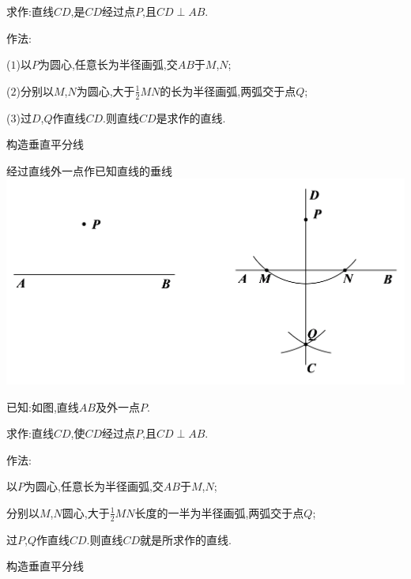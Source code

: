 \documentclass[cn,blue,12pt]{elegantbook}
\begin{document}
\begin{zsyd}
\begin{zsyd}
\begin{zsyd}
        \item 求作:直线\(CD\),是\(CD\)经过点\(P\),且\(CD \perp AB.\)
        \item 作法:
            \begin{zsyd}
            \item (\(1\))以\(P\)为圆心,任意长为半径画弧,交\(AB\)于\(M\),\(N\);
            \item (\(2\))分别以\(M\),\(N\)为圆心,大于\(\frac{1}{2}MN\)的长为半径画弧,两弧交于点\(Q\);
            \item (\(3\))过\(D\),\(Q\)作直线\(CD.\)则直线\(CD\)是求作的直线.
            \end{zsyd}
        \end{zsyd}
\begin{note}
            构造垂直平分线
\end{note}
    \item 经过直线外一点作已知直线的垂线\\
        \includegraphics[width=0.8\linewidth]{pic/20200515009.png}\\
        \begin{zsyd}
        \item 已知:如图,直线\(AB\)及外一点\(P.\)
        \item 求作:直线\(CD\),使\(CD\)经过点\(P\),且\(CD \perp AB.\)
        \item 作法:
            \begin{zsyd}
            \item 以\(P\)为圆心,任意长为半径画弧,交\(AB\)于\(M\),\(N\);
            \item 分别以\(M\),\(N\)圆心,大于\(\frac{1}{2}MN\)长度的一半为半径画弧,两弧交于点\(Q\);
            \item 过\(P\),\(Q\)作直线\(CD.\)则直线\(CD\)就是所求作的直线.
            \end{zsyd}
        \end{zsyd}
\begin{note}
            构造垂直平分线
\end{note}

\end{zsyd}
\end{zsyd}
\end{document}
